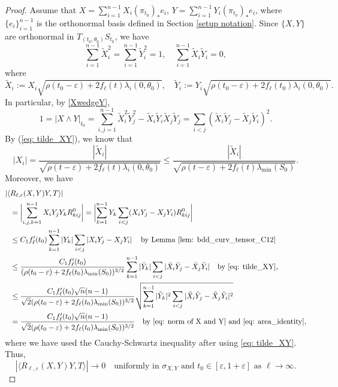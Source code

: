 \documentclass[10pt]{amsart}
\theoremstyle{definition}
\let\eps\varepsilon
\renewcommand{\>}{{\rangle}}
\newcommand{\<}{{\langle}}
\begin{document}
\begin{proof}
Assume that
$X=\sum_{i=1}^{n-1}X_i(\pi_{t_0})_*e_i$, $Y=\sum_{i=1}^{n-1}Y_i(\pi_{t_0})_*e_i$, where $\{e_i\}_{i=1}^{n-1}$ is the orthonormal basis defined in Section \ref{setup notation}. Since $\{X,Y\}$ are orthonormal in $T_{(t_0,\theta_0)}S_{t_0}$, we have
\begin{equation}\label{eq: norm of X and Y}
\sum_{i=1}^{n-1}\tilde{X}_i^2=\sum_{i=1}^{n-1}\tilde{Y}_i^2=1, \quad \sum_{i=1}^{n-1}\tilde{X}_i\tilde{Y}_i=0,
\end{equation}
where
\begin{equation}\label{eq: tilde_XY}
\tilde{X}_i:=X_i\sqrt{\rho(t_0-\eps)+2f_\ell(t)\lambda_i(0,\theta_0)},\quad  \tilde{Y}_i:=Y_i\sqrt{\rho(t_0-\eps)+2f_\ell(t_0)\lambda_i(0,\theta_0)}.
\end{equation}
In particular, by \eqref{XwedgeY},
\begin{equation}\label{eq: area_identity}
1=|X\wedge Y|_{t_0}=\sum_{i,j=1}^{n-1}\tilde{X}_i^2\tilde{Y}_j^2-\tilde{X}_i\tilde{Y}_i\tilde{X}_j\tilde{Y}_j=\sum_{i<j}(\tilde{X}_i \tilde{Y}_j-\tilde{X}_j\tilde{Y}_i)^2.
\end{equation}
By (\ref{eq: tilde_XY}), we know that
\[
|X_i|=\frac{|\tilde{X}_i|}{\sqrt{\rho(t-\eps)+2f_\ell(t)\lambda_i(0,\theta_0)}}\leq \frac{|\tilde{X}_i|}{\sqrt{\rho(t-\eps)+2f_\ell(t)\lambda_{\min}(S_0)}}.
\]
Moreover, we have
\begin{align}
|\langle &R_{\ell,\eps}(X,Y)Y,T\rangle|\label{eq: mixed term bound}
\\&=\biggl|\sum_{i,j,k=1}^{n-1}X_iY_jY_k R^0_{kij}\biggr|=\biggl|\sum_{k=1}^{n-1}Y_k\sum_{i<j}(X_iY_j-X_jY_i)R^0_{kij}\biggr|\nonumber
\\&\leq C_1f'_\ell(t_0)\sum_{k=1}^{n-1}|Y_k|\sum_{i<j}\left|X_iY_j-X_jY_i\right|\quad \text{by Lemma~\ref{lem: bdd_curv_tensor_C12}}\nonumber
\\&\leq \frac{C_1f'_\ell(t_0)}{(\rho(t_0-\eps)+2f_\ell(t_0)\lambda_{\min}(S_0))^{3/2}}\sum_{k=1}^{n-1} |\tilde{Y}_k|\sum_{i<j}|\tilde{X}_i \tilde{Y}_j-\tilde{X}_j\tilde{Y}_i| \quad \text{by \eqref{eq: tilde_XY}},\nonumber
\\&\leq \frac{C_1f'_\ell(t_0)\sqrt{n}(n-1)}{\sqrt{2}(\rho(t_0-\eps)+2f_\ell(t_0)\lambda_{\min}(S_0))^{3/2}}\sqrt{\sum_{k=1}^{n-1} |\tilde{Y}_k|^2\sum_{i<j}|\tilde{X}_i \tilde{Y}_j-\tilde{X}_j\tilde{Y}_i|^2}\nonumber
\\&= \frac{C_1f'_\ell(t_0)\sqrt{n}(n-1)}{\sqrt{2}(\rho(t_0-\eps)+2f_\ell(t_0)\lambda_{\min}(S_0))^{3/2}} \quad \text{by \eqref{eq: norm of X and Y} and \eqref{eq: area_identity}},\nonumber
\end{align}
where we have used the Cauchy-Schwartz inequality after using \eqref{eq: tilde_XY}.
Thus,
\begin{equation*}
|\langle R_{\ell,\eps}(X,Y)Y,T\rangle|\to 0 \quad\text{uniformly in } \sigma_{X,Y} \text{ and } t_0\in [\eps,1+\eps] \text{ as }\ell\to\infty.
\end{equation*}


\end{proof}
\end{document}
